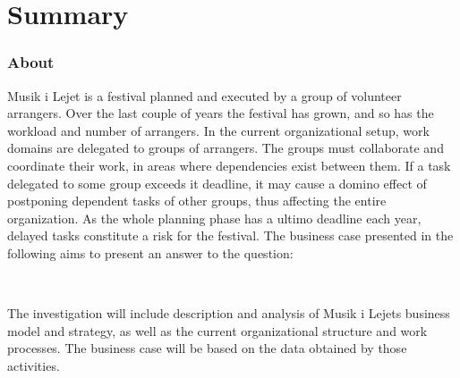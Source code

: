\part{Summary}

\section{About}
Musik i Lejet is a festival planned and executed by a group of volunteer arrangers. Over the last couple of years the festival has grown, and so has the workload and number of arrangers. In the current organizational setup, work domains are delegated to groups of arrangers. The groups must collaborate and coordinate their work, in areas where dependencies exist between them. If a task delegated to some group exceeds it deadline, it may cause a domino effect of postponing dependent tasks of other groups, thus affecting the entire organization. As the whole planning phase has a ultimo deadline each year, delayed tasks constitute a risk for the festival. The business case presented in the following aims to present an answer to the question:
\vspace{1pt}
\begin{center}
\\
\end{center}
\vspace{1pt}
\noindent
The investigation will include description and analysis of Musik i Lejets business model and strategy, as well as the current organizational structure and work processes. The business case will be based on the data obtained by those activities.

